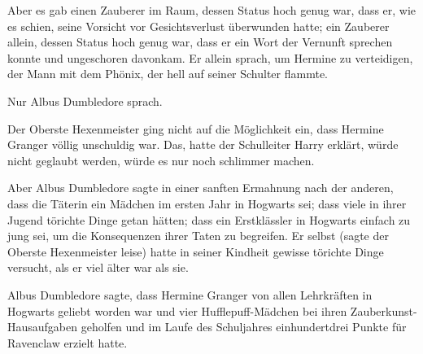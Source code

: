 Aber es gab einen Zauberer im Raum, dessen Status hoch genug war, dass er, wie es schien, seine Vorsicht vor Gesichtsverlust überwunden hatte; ein Zauberer allein, dessen Status hoch genug war, dass er ein Wort der Vernunft sprechen konnte und ungeschoren davonkam. Er allein sprach, um Hermine zu verteidigen, der Mann mit dem Phönix, der hell auf seiner Schulter flammte.

Nur Albus Dumbledore sprach.

Der Oberste Hexenmeister ging nicht auf die Möglichkeit ein, dass Hermine Granger völlig unschuldig war. Das, hatte der Schulleiter Harry erklärt, würde nicht geglaubt werden, würde es nur noch schlimmer machen.

Aber Albus Dumbledore sagte in einer sanften Ermahnung nach der anderen, dass die Täterin ein Mädchen im ersten Jahr in Hogwarts sei; dass viele in ihrer Jugend törichte Dinge getan hätten; dass ein Erstklässler in Hogwarts einfach zu jung sei, um die Konsequenzen ihrer Taten zu begreifen. Er selbst (sagte der Oberste Hexenmeister leise) hatte in seiner Kindheit gewisse törichte Dinge versucht, als er viel älter war als sie.

Albus Dumbledore sagte, dass Hermine Granger von allen Lehrkräften in Hogwarts geliebt worden war und vier Hufflepuff-Mädchen bei ihren Zauberkunst-Hausaufgaben geholfen und im Laufe des Schuljahres einhundertdrei Punkte für Ravenclaw erzielt hatte.

